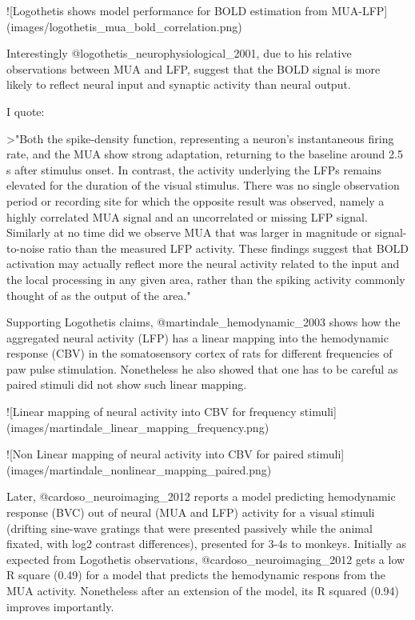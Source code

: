 ![Logothetis shows model performance for BOLD estimation from MUA-LFP](images/logothetis_mua_bold_correlation.png)

Interestingly @logothetis_neurophysiological_2001, due to his relative observations between MUA and LFP, suggest that the BOLD signal is more likely to reflect neural input and synaptic activity than neural output.

I quote:

>"Both the spike-density function, representing a neuron's instantaneous firing rate, and the MUA show strong adaptation, returning to the baseline around 2.5 s after stimulus onset. In contrast, the activity underlying the LFPs remains elevated for the duration of the visual stimulus. There was no single observation period or recording site for which the opposite result was observed, namely a highly correlated MUA signal and an uncorrelated or missing LFP signal. Similarly at no time did we observe MUA that was larger in magnitude or signal-to-noise ratio than the measured LFP activity. These findings suggest that BOLD activation may actually reflect more the neural activity related to the input and the local processing in any given area, rather than the spiking activity commonly thought of as the output of the area."

Supporting Logothetis claims, @martindale_hemodynamic_2003 shows how the aggregated neural activity (LFP) has a linear mapping into the hemodynamic response (CBV) in the somatosensory cortex of rats for different frequencies of paw pulse stimulation. Nonetheless he also showed that one has to be careful as paired stimuli did not show such linear mapping.

![Linear mapping of neural activity into CBV for frequency stimuli](images/martindale_linear_mapping_frequency.png)

![Non Linear mapping of neural activity into CBV for paired stimuli](images/martindale_nonlinear_mapping_paired.png)

Later, @cardoso_neuroimaging_2012 reports a model predicting hemodynamic response (BVC) out of neural (MUA and LFP) activity for a visual stimuli (drifting sine-wave gratings that were presented passively while the animal fixated, with log2 contrast differences), presented for 3-4s to monkeys. Initially as expected from Logothetis observations, @cardoso_neuroimaging_2012 gets a low R square (0.49) for a model that predicts the hemodynamic respons from the MUA activity. Nonetheless after an extension of the model, its R squared (0.94) improves importantly.

